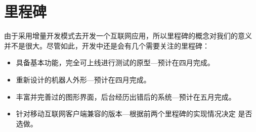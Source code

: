 \section{里程碑}

由于采用增量开发模式去开发一个互联网应用，所以里程碑的概念对我们的意义
并不是很大。尽管如此，开发中还是会有几个需要关注的里程碑：
\begin{itemize}
\item 具备基本功能，完全可上线进行测试的原型---预计在四月完成。
\item 重新设计的机器人外形---预计在四月完成。
\item 丰富并完善过的图形界面，后台经历出错后的系统---预计在五月完成。
\item 针对移动互联网客户端兼容的版本---根据前两个里程碑的实现情况决定
  是否选做。
\end{itemize}





